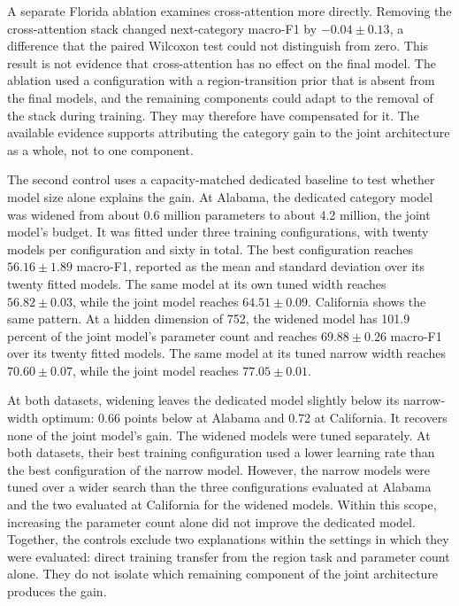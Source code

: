 A separate Florida ablation examines cross-attention more directly. Removing the
cross-attention stack changed next-category macro-F1 by $-0.04 \pm 0.13$, a difference
that the paired Wilcoxon test could not distinguish from zero. This result is not
evidence that cross-attention has no effect on the final model. The ablation used a
configuration with a region-transition prior that is absent from the final models, and
the remaining components could adapt to the removal of the stack during training. They
may therefore have compensated for it. The available evidence supports attributing
the category gain to the joint architecture as a whole, not to one component.

The second control uses a capacity-matched dedicated baseline to test whether model
size alone explains the gain. At Alabama, the dedicated category model was widened
from about 0.6 million parameters to about 4.2 million, the joint model's budget. It
was fitted under three training configurations, with twenty models per configuration
and sixty in total. The best configuration reaches $56.16 \pm 1.89$ macro-F1, reported
as the mean and standard deviation over its twenty fitted models. The same model at its
own tuned width reaches $56.82 \pm 0.03$, while the joint model reaches
$64.51 \pm 0.09$. California shows the same pattern. At a hidden dimension of 752, the
widened model has 101.9 percent of the joint model's parameter count and reaches
$69.88 \pm 0.26$ macro-F1 over its twenty fitted models. The same model at its tuned
narrow width reaches $70.60 \pm 0.07$, while the joint model reaches
$77.05 \pm 0.01$.

At both datasets, widening leaves the dedicated model slightly below its narrow-width
optimum: 0.66 points below at Alabama and 0.72 at California. It recovers none of the
joint model's gain. The widened models were tuned separately. At both datasets, their
best training configuration used a lower learning rate than the best configuration of
the narrow model. However, the narrow models were tuned over a wider search than the
three configurations evaluated at Alabama and the two evaluated at California for the
widened models. Within this scope, increasing the parameter count alone did not improve
the dedicated model. Together, the controls exclude two explanations within the
settings in which they were evaluated: direct training transfer from the region task
and parameter count alone. They do not isolate which remaining component of the joint
architecture produces the gain.

